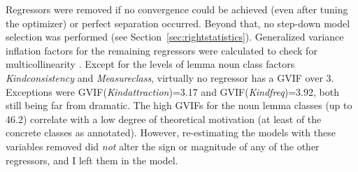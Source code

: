 \documentclass[USenglish]{article}
\begin{document}
%

Regressors were removed if no convergence could be achieved (even after tuning the optimizer) or perfect separation occurred.
Beyond that, no step-down model selection was performed (see Section~\ref{sec:rightstatistics}).
Generalized variance inflation factors for the remaining regressors were calculated to check for multicollinearity \citep{FoxMonette1992}.
Except for the levels of lemma noun class factors \textit{Kindconsistency} and \textit{Measureclass}, virtually no regressor has a GVIF over 3.
Exceptions were GVIF(\textit{Kindattraction})=3.17 and GVIF(\textit{Kindfreq})=3.92, both still being far from dramatic.
The high GVIFs for the noun lemma classes (up to 46.2) correlate with a low degree of theoretical motivation (at least of the concrete classes as annotated).
However, re-estimating the models with these variables removed did \textit{not} alter the sign or magnitude of any of the other regressors, and I left them in the model.
\end{document}
